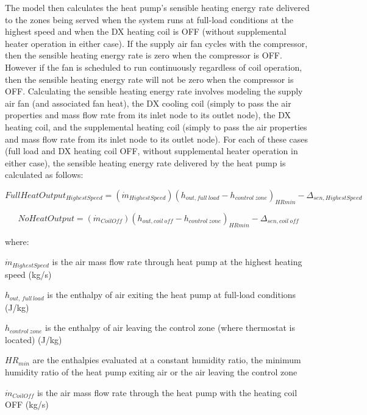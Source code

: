 The model then calculates the heat pump's sensible heating energy rate delivered to the zones being served when the system runs at full-load conditions at the highest speed and when the DX heating coil is OFF (without supplemental heater operation in either case). If the supply air fan cycles with the compressor, then the sensible heating energy rate is zero when the compressor is OFF. However if the fan is scheduled to run continuously regardless of coil operation, then the sensible heating energy rate will not be zero when the compressor is OFF. Calculating the sensible heating energy rate involves modeling the supply air fan (and associated fan heat), the DX cooling coil (simply to pass the air properties and mass flow rate from its inlet node to its outlet node), the DX heating coil, and the supplemental heating coil (simply to pass the air properties and mass flow rate from its inlet node to its outlet node). For each of these cases (full load and DX heating coil OFF, without supplemental heater operation in either case), the sensible heating energy rate delivered by the heat pump is calculated as follows:

\begin{equation}
FullHeatOutpu{t_{HighestSpeed}} = \left( {{{\dot m}_{HighestSpeed}}} \right){\left( {{h_{out,full~load}} - {h_{control~zone}}} \right)_{HRmin}} - {\Delta_{sen,HighestSpeed}}
\end{equation}

\begin{equation}
NoHeatOutput = \left( {{{\dot m}_{CoilOff}}} \right){\left( {{h_{out,coil~off}} - {h_{control~zone}}} \right)_{HRmin}} - {\Delta_{sen,coil~off}}
\end{equation}

where:

\({\dot m}_{HighestSpeed}\) is the air mass flow rate through heat pump at the highest heating speed (kg/s)

\(h_{out,\, full\, load}\) is the enthalpy of air exiting the heat pump at full-load conditions (J/kg)

\(h_{control~zone}\) is the enthalpy of air leaving the control zone (where thermostat is located) (J/kg)

\(HR_{min}\) are the enthalpies evaluated at a constant humidity ratio, the minimum humidity ratio of the heat pump exiting air or the air leaving the control zone

\({\dot m}_{CoilOff}\) is the air mass flow rate through the heat pump with the heating coil OFF (kg/s)

